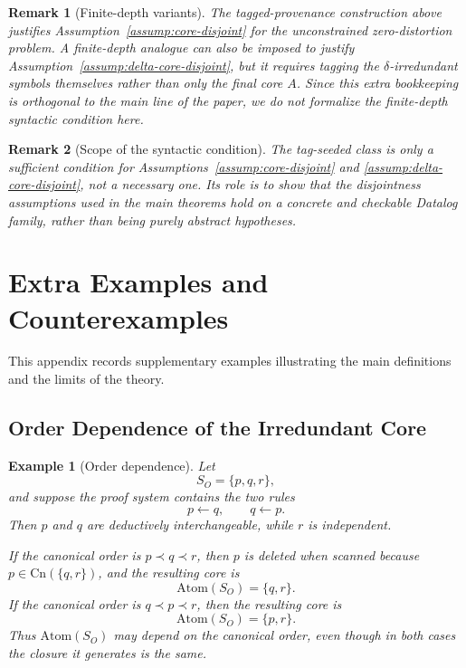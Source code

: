 \documentclass[journal,onecolumn]{IEEEtran}
\newcommand{\Atom}{\text{Atom}}
\newcommand{\Cn}{\text{Cn}}
\newtheorem{remark}{Remark}[section]
\newtheorem{example}{Example}[section]
\numberwithin{equation}{section}
\begin{document}
\begin{remark}[Finite-depth variants]
\label{rem:datalog-delta-disjoint}
The tagged-provenance construction above justifies
Assumption~\ref{assump:core-disjoint} for the unconstrained
zero-distortion problem.
A finite-depth analogue can also be imposed to justify
Assumption~\ref{assump:delta-core-disjoint}, but it requires tagging
the \(\delta\)-irredundant symbols themselves rather than only the
final core \(A\).
Since this extra bookkeeping is orthogonal to the main line of the
paper, we do not formalize the finite-depth syntactic condition here.
\end{remark}

\begin{remark}[Scope of the syntactic condition]
\label{rem:datalog-scope}
The tag-seeded class is only a sufficient condition for
Assumptions~\ref{assump:core-disjoint} and
\ref{assump:delta-core-disjoint}, not a necessary one.
Its role is to show that the disjointness assumptions used in the
main theorems hold on a concrete and checkable Datalog family, rather
than being purely abstract hypotheses.
\end{remark}

\section{Extra Examples and Counterexamples}
\label{app:extra-examples}

This appendix records supplementary examples illustrating the main
definitions and the limits of the theory.

\subsection{Order Dependence of the Irredundant Core}
\label{app:example-order-dependence}

\begin{example}[Order dependence]
\label{ex:order-dependence}
Let
\[
  S_O=\{p,q,r\},
\]
and suppose the proof system contains the two rules
\[
  p\leftarrow q,
  \qquad
  q\leftarrow p.
\]
Then \(p\) and \(q\) are deductively interchangeable, while \(r\) is
independent.

If the canonical order is \(p\prec q\prec r\), then \(p\) is deleted
when scanned because \(p\in\Cn(\{q,r\})\), and the resulting core is
\[
  \Atom(S_O)=\{q,r\}.
\]
If the canonical order is \(q\prec p\prec r\), then the resulting
core is
\[
  \Atom(S_O)=\{p,r\}.
\]
Thus \(\Atom(S_O)\) may depend on the canonical order, even though in
both cases the closure it generates is the same.
\end{example}
\end{document}
